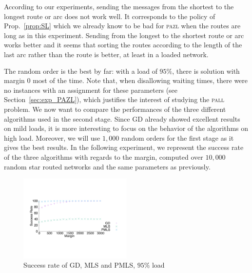 \documentclass[10pt, conference, letterpaper]{IEEEtran}
\newcommand\pazl{\textsc{pazl}\xspace}
\newcommand\pall{\textsc{pall}\xspace}
\begin{document}
     
     According to our experiments, sending the messages from the shortest to the longest route or arc does not work well. It corresponds to the policy of Prop.~\ref{prop:SL} which we already know to be bad for \pazl when the routes are long as in this experiment. Sending from the longest to the shortest route or arc works better and it seems that sorting the routes according to the length of the last arc rather than the route is better, at least in a loaded network. 
     
     The random order is the best by far: with a load of $95\%$, there is solution with margin $0$ most of the time. Note that, when disallowing waiting times, there were no instances with an assignment for these parameters (see Section~\ref{sec:exp_PAZL}), which justifies the interest of studying the \pall problem. We now want to compare the performances of the three different algorithms used in the second stage. Since GD already showed excellent results on mild loads, it is more interesting to focus on the behavior of the algorithms on high load. Moreover, we will use $1,000$ random orders for the first stage as it gives the best results. In the following experiment, we represent the success rate of the three algorithms with regards to the margin,  computed over $10,000$ random star routed networks and the same parameters as previously.
     
    \begin{figure} [h] 
       \begin{center}
      \includegraphics[width=0.5\textwidth]{retour_21000.pdf}
      \end{center}
      \caption{Success rate of GD, MLS and PMLS, $95\%$ load}
     \label{fig:success21000}
     \end{figure}
\end{document}
